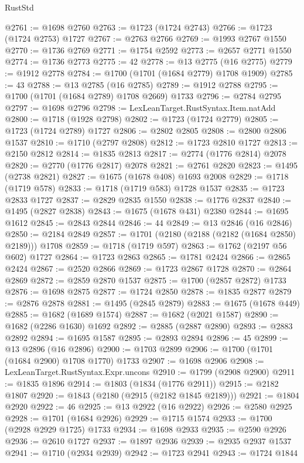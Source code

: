 \begin{lexlean}{RustStd}
\begin{coremodule}
@2761 := @1698 @2760
@2763 := @1723 (@1724 @2743)
@2766 := @1723 (@1724 @2753) @1727
@2767 := @2763 @2766
@2769 := @1993 @2767 @1550
@2770 := @1736 @2769
@2771 := @1754 @2592
@2773 := @2657 @2771 @1550
@2774 := @1736 @2773
@2775 := 42
@2778 := @13 @2775 (@16 @2775)
@2779 := @1912 @2778
@2784 := @1700 (@1701 (@1684 @2779) @1708 @1909)
@2785 := 43
@2788 := @13 @2785 (@16 @2785)
@2789 := @1912 @2788
@2795 := @1700 (@1701 (@1684 @2789) @1708 @2669) @1733
@2796 := @2784 @2795
@2797 := @1698 @2796
@2798 := LexLeanTarget.RustSyntax.Item.natAdd
@2800 := @1718 (@1928 @2798)
@2802 := @1723 (@1724 @2779)
@2805 := @1723 (@1724 @2789) @1727
@2806 := @2802 @2805
@2808 := @2800 @2806 @1537
@2810 := @1710 (@2797 @2808)
@2812 := @1723 @2810 @1727
@2813 := @2150 @2812
@2814 := @1835 @2813
@2817 := @2774 (@1776 @2814) @2078
@2820 := @2770 (@1776 @2817) @2078
@2821 := @2761 @2820
@2823 := @1495 (@2738 @2821)
@2827 := @1675 (@1678 @408) @1693 @2008
@2829 := @1718 (@1719 @578)
@2833 := @1718 (@1719 @583) @1728 @1537
@2835 := @1723 @2833 @1727
@2837 := @2829 @2835 @1550
@2838 := @1776 @2837
@2840 := @1495 (@2827 @2838)
@2843 := @1675 (@1678 @431) @2380
@2844 := @1695 @1612
@2845 := @2843 @2844
@2846 := 44
@2849 := @13 @2846 (@16 @2846)
@2850 := @2184 @2849
@2857 := @1701 (@2180 (@2188 (@2182 (@1684 @2850) @2189))) @1708
@2859 := @1718 (@1719 @597)
@2863 := @1762 (@2197 @56 @602) @1727
@2864 := @1723 @2863
@2865 := @1781 @2424
@2866 := @2865 @2424
@2867 := @2520 @2866
@2869 := @1723 @2867 @1728
@2870 := @2864 @2869
@2872 := @2859 @2870 @1537
@2875 := @1700 (@2857 @2872) @1733
@2876 := @1698 @2875
@2877 := @1724 @2850
@2878 := @1835 @2877
@2879 := @2876 @2878
@2881 := @1495 (@2845 @2879)
@2883 := @1675 (@1678 @449)
@2885 := @1682 (@1689 @1574)
@2887 := @1682 (@2021 @1587)
@2890 := @1682 (@2286 @1630) @1692
@2892 := @2885 (@2887 @2890)
@2893 := @2883 @2892
@2894 := @1695 @1587
@2895 := @2893 @2894
@2896 := 45
@2899 := @13 @2896 (@16 @2896)
@2900 := @1703 @2899
@2906 := @1700 (@1701 (@1684 @2900) @1708 @1770) @1733
@2907 := @1698 @2906
@2908 := LexLeanTarget.RustSyntax.Expr.uncons
@2910 := @1799 (@2908 @2900)
@2911 := @1835 @1896
@2914 := @1803 (@1834 (@1776 @2911))
@2915 := @2182 @1807
@2920 := @1843 (@2180 (@2915 (@2182 @1845 @2189)))
@2921 := @1804 @2920
@2922 := 46
@2925 := @13 @2922 (@16 @2922)
@2926 := @2580 @2925
@2928 := @1701 (@1684 @2926)
@2929 := @1715 @1574
@2933 := @1700 (@2928 @2929 @1725) @1733
@2934 := @1698 @2933
@2935 := @2590 @2926
@2936 := @2610 @1727
@2937 := @1897 @2936
@2939 := @2935 @2937 @1537
@2941 := @1710 (@2934 @2939)
@2942 := @1723 @2941
@2943 := @1724 @1844

\end{coremodule}
\end{lexlean}
